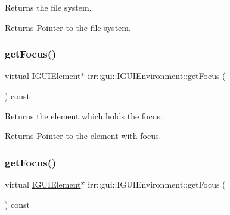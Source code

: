 Returns the file system. 

\begin{DoxyReturn}{Returns}
Pointer to the file system. 
\end{DoxyReturn}
\mbox{\label{classirr_1_1gui_1_1IGUIEnvironment_a624c047cb88a5d3e3e0d17a42a627335}} 
\subsubsection{\texorpdfstring{get\+Focus()}{getFocus()}\hspace{0.1cm}{\footnotesize\ttfamily [1/2]}}
{\footnotesize\ttfamily virtual \hyperlink{classirr_1_1gui_1_1IGUIElement}{I\+G\+U\+I\+Element}$\ast$ irr\+::gui\+::\+I\+G\+U\+I\+Environment\+::get\+Focus (\begin{DoxyParamCaption}{ }\end{DoxyParamCaption}) const\hspace{0.3cm}{\ttfamily [pure virtual]}}



Returns the element which holds the focus. 

\begin{DoxyReturn}{Returns}
Pointer to the element with focus. 
\end{DoxyReturn}
\mbox{\label{classirr_1_1gui_1_1IGUIEnvironment_a624c047cb88a5d3e3e0d17a42a627335}} 
\subsubsection{\texorpdfstring{get\+Focus()}{getFocus()}\hspace{0.1cm}{\footnotesize\ttfamily [2/2]}}
{\footnotesize\ttfamily virtual \hyperlink{classirr_1_1gui_1_1IGUIElement}{I\+G\+U\+I\+Element}$\ast$ irr\+::gui\+::\+I\+G\+U\+I\+Environment\+::get\+Focus (\begin{DoxyParamCaption}{ }\end{DoxyParamCaption}) const\hspace{0.3cm}{\ttfamily [pure virtual]}}



